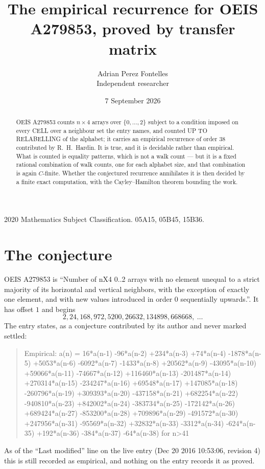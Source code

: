 \documentclass[11pt,a4paper]{article}
\title{The empirical recurrence for OEIS A279853, proved by transfer matrix}
\author{Adrian Perez Fontelles\\ \small Independent researcher}
\date{7 September 2026}
\theoremstyle{plain}
\theoremstyle{definition}
\begin{document}
\maketitle

\begin{abstract}
OEIS A279853 counts $n\times4$ arrays over $\{0,\dots,2\}$ subject to a condition imposed on
every CELL over a neighbour set the entry names, and counted UP TO RELABELLING of the
alphabet; it carries an empirical recurrence of order $38$ contributed by
R.~H.~Hardin. It is true, and it is decidable rather than empirical. What is counted is
equality patterns, which is not a walk count --- but it is a fixed rational combination of
walk counts, one for each alphabet size, and that combination is again $C$-finite. Whether the
conjectured recurrence annihilates it is then decided by a finite exact computation, with the
Cayley--Hamilton theorem bounding the work.
\end{abstract}

\noindent\small 2020 Mathematics Subject Classification. 05A15, 05B45, 15B36.\normalsize

\section{The conjecture}

OEIS A279853 is ``Number of nX4 0..2 arrays with no element unequal to a strict majority of its horizontal and vertical neighbors, with the exception of exactly one element, and with new values introduced in order 0 sequentially upwards.''. It has offset $1$ and begins
\[
2, 24, 168, 972, 5200, 26632, 134898, 668668,\ \dots
\]
The entry states, as a conjecture contributed by its author and never marked settled:
\begin{quote}
Empirical: a(n) = 16*a(n-1) -96*a(n-2) +234*a(n-3) +74*a(n-4) -1878*a(n-5) +5053*a(n-6) -6092*a(n-7) -1433*a(n-8) +20562*a(n-9) -43095*a(n-10) +59066*a(n-11) -74667*a(n-12) +116460*a(n-13) -201487*a(n-14) +270314*a(n-15) -234247*a(n-16) +69548*a(n-17) +147085*a(n-18) -260796*a(n-19) +309393*a(n-20) -437158*a(n-21) +682254*a(n-22) -940810*a(n-23) +842002*a(n-24) -383734*a(n-25) -172142*a(n-26) +689424*a(n-27) -853200*a(n-28) +709896*a(n-29) -491572*a(n-30) +247956*a(n-31) -95569*a(n-32) +32832*a(n-33) -3312*a(n-34) -624*a(n-35) +192*a(n-36) -384*a(n-37) -64*a(n-38) for n>41
\end{quote}
As of the ``Last modified'' line on the live entry (Dec 20 2016 10:53:06, revision 4) this is still
recorded as empirical, and nothing on the entry records it as proved.
\end{document}

